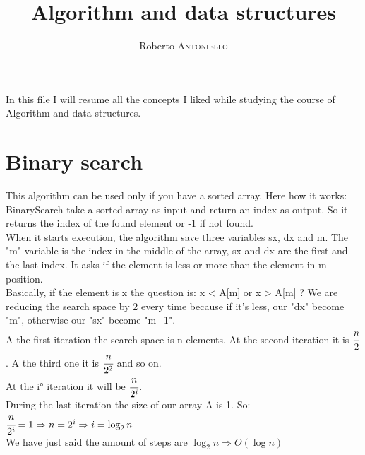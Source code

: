 \documentclass{article}
\title{Algorithm and data structures} %
\author{Roberto \textsc{Antoniello}} %
\begin{document}
\maketitle %

\begin{center} In this file I will resume all the concepts I liked while studying the course of Algorithm and data structures.\end{center}

\section{Binary search}
This algorithm can be used only if you have a sorted array. Here how it works: \\
BinarySearch take a sorted array as input and return an index as output. So it returns the index of the found element or -1 if not found.\\
When it starts execution, the algorithm save three variables sx, dx and m. The "m" variable is the index in the middle of the array, sx and dx are the first and the last index. It asks if the element is less or more than the element in m position. \\
Basically, if the element is x the question is: 
x < A[m]  or  x > A[m] ? 
We are reducing the search space by 2 every time because if it's less, our "dx" become "m", otherwise our "sx" become "m+1". \\
A the first iteration the search space is n elements. At the second iteration it is $\cfrac{n}{2}$. A the third one it is $\cfrac{n}{2^2}$ and so on.\\
At the i° iteration it will be $\cfrac{n}{2^i}$.\\
During the last iteration the size of our array A is 1. So:\\
$\cfrac{n}{2^i} = 1 \Rightarrow n = 2^i \Rightarrow i = \log_2{n}$ \\
We have just said the amount of steps are $\log_2{n} \Rightarrow O(\log{n})$
\end{document}
